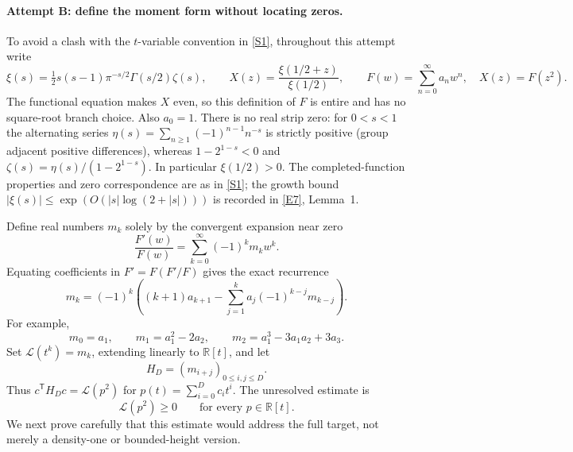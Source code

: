 \documentclass[11pt]{article}
\newcommand{\R}{\mathbb{R}}
\newcommand{\sref}[2]{\hyperlink{source:#1:#2}{[S#2]}}
\newcommand{\eref}[2]{\hyperlink{extra:#1:#2}{[E#2]}}
\begin{document}
\paragraph{Attempt B: define the moment form without locating zeros.}
To avoid a clash with the $t$-variable convention in \sref{2}{1}, throughout
this attempt write
\[
 \xi(s)=\tfrac12s(s-1)\pi^{-s/2}\Gamma(s/2)\zeta(s),\qquad
 X(z)=\frac{\xi(1/2+z)}{\xi(1/2)},\qquad
 F(w)=\sum_{n=0}^{\infty}a_nw^n,\quad X(z)=F(z^2).
\]
The functional equation makes $X$ even, so this definition of $F$ is entire
and has no square-root branch choice. Also $a_0=1$. There is no real strip zero:
for $0<s<1$ the alternating series
$\eta(s)=\sum_{n\ge1}(-1)^{n-1}n^{-s}$ is strictly positive (group adjacent
positive differences), whereas $1-2^{1-s}<0$ and
$\zeta(s)=\eta(s)/(1-2^{1-s})$. In particular $\xi(1/2)>0$.
The completed-function properties and zero correspondence are as in
\sref{2}{1}; the growth bound
$|\xi(s)|\le\exp(O(|s|\log(2+|s|)))$ is recorded in
\eref{2}{7}, Lemma~1.

Define real numbers $m_k$ solely by the convergent expansion near zero
\begin{equation}\label{ra:2:moment-definition}
 \frac{F'(w)}{F(w)}=\sum_{k=0}^{\infty}(-1)^km_kw^k.
\end{equation}
Equating coefficients in $F'=F(F'/F)$ gives the exact recurrence
\begin{equation}\label{ra:2:recurrence}
 m_k=(-1)^k\left((k+1)a_{k+1}
       -\sum_{j=1}^{k}a_j(-1)^{k-j}m_{k-j}\right).
\end{equation}
For example,
\[
 m_0=a_1,\qquad m_1=a_1^2-2a_2,\qquad
 m_2=a_1^3-3a_1a_2+3a_3.
\]
Set $\mathcal L(t^k)=m_k$, extending linearly to $\R[t]$, and let
\begin{equation}\label{ra:2:hankel}
 H_D=(m_{i+j})_{0\le i,j\le D}.
\end{equation}
Thus $c^{\mathsf T}H_Dc=\mathcal L(p^2)$ for
$p(t)=\sum_{i=0}^D c_it^i$. The unresolved estimate is
\begin{equation}\label{ra:2:missing-positivity}
 \mathcal L(p^2)\ge0\qquad\text{for every }p\in\R[t].
\end{equation}
We next prove carefully that this estimate would address the full target,
not merely a density-one or bounded-height version.
\end{document}

